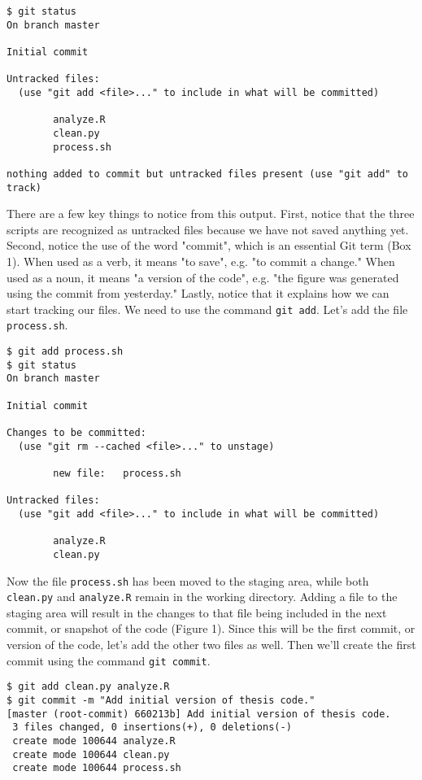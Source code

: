 \begin{lstlisting}
$ git status
On branch master

Initial commit

Untracked files:
  (use "git add <file>..." to include in what will be committed)

        analyze.R
        clean.py
        process.sh

nothing added to commit but untracked files present (use "git add" to track)
\end{lstlisting}

There are a few key things to notice from this output.
First, notice that the three scripts are recognized as untracked files because we have not saved anything yet.
Second, notice the use of the word "commit", which is an essential Git term (Box 1).
When used as a verb, it means "to save", e.g. "to commit a change."
When used as a noun, it means "a version of the code", e.g. "the figure was generated using the commit from yesterday."
Lastly, notice that it explains how we can start tracking our files.
We need to use the command \verb|git add|.
Let's add the file \verb|process.sh|.

\begin{lstlisting}
$ git add process.sh
$ git status
On branch master

Initial commit

Changes to be committed:
  (use "git rm --cached <file>..." to unstage)

        new file:   process.sh

Untracked files:
  (use "git add <file>..." to include in what will be committed)

        analyze.R
        clean.py
\end{lstlisting}

Now the file \verb|process.sh| has been moved to the staging area, while both \verb|clean.py| and \verb|analyze.R| remain in the working directory.
Adding a file to the staging area will result in the changes to that file being included in the next commit, or snapshot of the code (Figure 1).
Since this will be the first commit, or version of the code, let's add the other two files as well.
Then we'll create the first commit using the command \verb|git commit|.

\begin{lstlisting}
$ git add clean.py analyze.R
$ git commit -m "Add initial version of thesis code."
[master (root-commit) 660213b] Add initial version of thesis code.
 3 files changed, 0 insertions(+), 0 deletions(-)
 create mode 100644 analyze.R
 create mode 100644 clean.py
 create mode 100644 process.sh
\end{lstlisting}

